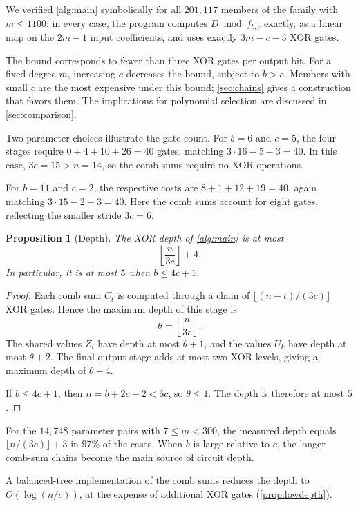 \documentclass{ieeeaccess}
\theoremstyle{plain}
\newtheorem{proposition}[theorem]{Proposition}
\theoremstyle{definition}
\begin{document}
We verified \cref{alg:main} symbolically for all $201,117$ members of the family
with $m\le1100$: in every case, the program computes $D\bmod f_{b,c}$ exactly,
as a linear map on the $2m-1$ input coefficients, and uses exactly $3m-c-3$ XOR
gates.

The bound corresponds to fewer than three XOR gates per output bit. For a fixed
degree $m$, increasing $c$ decreases the bound, subject to $b>c$. Members with
small $c$ are the most expensive under this bound; \cref{sec:chains} gives a
construction that favors them. The implications for polynomial selection are
discussed in \cref{sec:comparison}.

Two parameter choices illustrate the gate count. For $b=6$ and $c=5$, the four
stages require $0+4+10+26=40$ gates, matching $3\cdot16-5-3=40$. In this case,
$3c=15>n=14$, so the comb sums require no XOR operations.

For $b=11$ and $c=2$, the respective costs are $8+1+12+19=40$, again matching
$3\cdot15-2-3=40$. Here the comb sums account for eight gates, reflecting the
smaller stride $3c=6$.

\begin{proposition}[Depth]\label{prop:depth}
The XOR depth of \cref{alg:main} is at most
\[
  \left\lfloor\frac{n}{3c}\right\rfloor+4.
\]
In particular, it is at most $5$ when $b\le4c+1$.
\end{proposition}

\begin{proof}
Each comb sum $C_t$ is computed through a chain of $\lfloor(n-t)/(3c)\rfloor$
XOR gates. Hence the maximum depth of this stage is
\[
  \theta=\left\lfloor\frac{n}{3c}\right\rfloor.
\]
The shared values $Z_i$ have depth at most $\theta+1$, and the values $U_k$ have
depth at most $\theta+2$. The final output stage adds at most two XOR levels,
giving a maximum depth of $\theta+4$.

If $b\le4c+1$, then $n=b+2c-2<6c$, so $\theta\le1$. The depth is therefore at
most $5$.
\end{proof}

For the $14,748$ parameter pairs with $7\le m<300$, the measured depth equals
$\lfloor n/(3c)\rfloor+3$ in $97\%$ of the cases. When $b$ is large relative to
$c$, the longer comb-sum chains become the main source of circuit depth.

A balanced-tree implementation of the comb sums reduces the depth to
$O(\log(n/c))$, at the expense of additional XOR gates (\cref{prop:lowdepth}).
\end{document}
